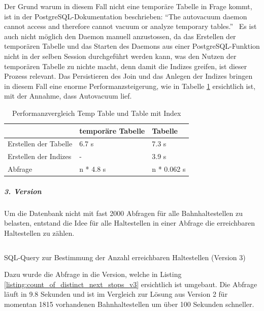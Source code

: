 Der Grund warum in diesem Fall nicht eine temporäre Tabelle in Frage kommt, ist in der PostgreSQL-Dokumentation beschrieben: "`The autovacuum daemon cannot access and therefore cannot vacuum or analyze temporary tables."'~\cite{postgresql_doc}
Es ist auch nicht möglich den Daemon manuell anzustossen, da das Erstellen der temporären Tabelle und das Starten des Daemons aus einer PostgreSQL-Funktion nicht in der selben Session durchgeführt werden kann, was den Nutzen der temporären Tabelle zu nichte macht, denn damit die Indizes greifen, ist dieser Prozess relevant.
Das Persistieren des Join und das Anlegen der Indizes bringen in diesem Fall eine enorme Performanzsteigerung, wie in Tabelle \ref{table:Performanzvergleich Temp Table und Table mit Index} ersichtlich ist, mit der Annahme, dass Autovacuum lief.

\begin{table}[ht]
    \centering
    \begin{tabular}[ht]{l l l}
        \toprule
        \textbf{} 
                                & \textbf{temporäre Tabelle}
                                & \textbf{Tabelle}\\
        \midrule
        Erstellen der Tabelle
                                & 6.7 s
                                & 7.3 s\\
        Erstellen der Indizes
                                & -
                                & 3.9 s\\
        Abfrage
                                & n * 4.8 s
                                & n * 0.062 s\\        
        \bottomrule
    \end{tabular}
    \caption{Performanzvergleich Temp Table und Table mit Index}
    \label{table:Performanzvergleich Temp Table und Table mit Index}
\end{table}

\subparagraph{3. Version}
Um die Datenbank nicht mit fast 2000 Abfragen für alle Bahnhaltestellen zu belasten, entstand die Idee für alle Haltestellen in einer Abfrage die erreichbaren Haltestellen zu zählen.

\begin{listing}[ht]
    \inputminted{sql}{projectdoc/listing/count_of_distinct_next_stops_v3.sql}
    \caption{SQL-Query zur Bestimmung der Anzahl erreichbaren Haltestellen (Version 3)}
    \label{listing:count_of_distinct_next_stops_v3}
\end{listing}

Dazu wurde die Abfrage in die Version, welche in Listing \ref{listing:count_of_distinct_next_stops_v3} ersichtlich ist umgebaut.
Die Abfrage läuft in 9.8 Sekunden und ist im Vergleich zur Lösung aus Version 2 für momentan 1815 vorhandenen Bahnhaltestellen um über 100 Sekunden schneller.

